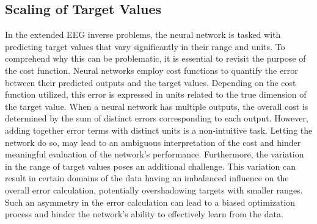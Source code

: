 \documentclass[a4paper, UKenglish, 11pt]{uiomaster}
\begin{document}
\subsection{Scaling of Target Values}

In the extended EEG inverse problems, the neural network is tasked with predicting target values that vary significantly in their range and units. To comprehend why this can be problematic, it is essential to revisit the purpose of the cost function. Neural networks employ cost functions to quantify the error between their predicted outputs and the target values. Depending on the cost function utilized, this error is expressed in units related to the true dimension of the target value. When a neural network has multiple outputs, the overall cost is determined by the sum of distinct errors corresponding to each output. However, adding together error terms with distinct units is a non-intuitive task. Letting the network do so, may lead to an ambiguous interpretation of the cost and hinder meaningful evaluation of the network's performance. Furthermore, the variation in the range of target values poses an additional challenge. This variation can result in certain domains of the data having an imbalanced influence on the overall error calculation, potentially overshadowing targets with smaller ranges. Such an asymmetry in the error calculation can lead to a biased optimization process and hinder the network's ability to effectively learn from the data.
\end{document}
